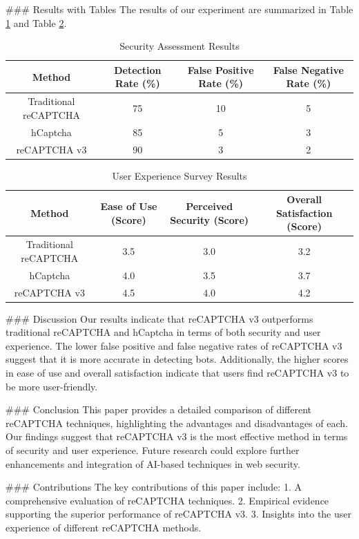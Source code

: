 ### Results with Tables
The results of our experiment are summarized in Table \ref{tab:security_assessment} and Table \ref{tab:user_experience}.

\begin{table}[ht]
\centering
\caption{Security Assessment Results}
\label{tab:security_assessment}
\begin{tabular}{|c|c|c|c|}
\hline
\textbf{Method} & \textbf{Detection Rate (\%)} & \textbf{False Positive Rate (\%)} & \textbf{False Negative Rate (\%)} \\
\hline
Traditional reCAPTCHA & 75 & 10 & 5 \\
\hline
hCaptcha & 85 & 5 & 3 \\
\hline
reCAPTCHA v3 & 90 & 3 & 2 \\
\hline
\end{tabular}
\end{table}

\begin{table}[ht]
\centering
\caption{User Experience Survey Results}
\label{tab:user_experience}
\begin{tabular}{|c|c|c|c|}
\hline
\textbf{Method} & \textbf{Ease of Use (Score)} & \textbf{Perceived Security (Score)} & \textbf{Overall Satisfaction (Score)} \\
\hline
Traditional reCAPTCHA & 3.5 & 3.0 & 3.2 \\
\hline
hCaptcha & 4.0 & 3.5 & 3.7 \\
\hline
reCAPTCHA v3 & 4.5 & 4.0 & 4.2 \\
\hline
\end{tabular}
\end{table}

### Discussion
Our results indicate that reCAPTCHA v3 outperforms traditional reCAPTCHA and hCaptcha in terms of both security and user experience. The lower false positive and false negative rates of reCAPTCHA v3 suggest that it is more accurate in detecting bots. Additionally, the higher scores in ease of use and overall satisfaction indicate that users find reCAPTCHA v3 to be more user-friendly.

### Conclusion
This paper provides a detailed comparison of different reCAPTCHA techniques, highlighting the advantages and disadvantages of each. Our findings suggest that reCAPTCHA v3 is the most effective method in terms of security and user experience. Future research could explore further enhancements and integration of AI-based techniques in web security.

### Contributions
The key contributions of this paper include:
1. A comprehensive evaluation of reCAPTCHA techniques.
2. Empirical evidence supporting the superior performance of reCAPTCHA v3.
3. Insights into the user experience of different reCAPTCHA methods.

